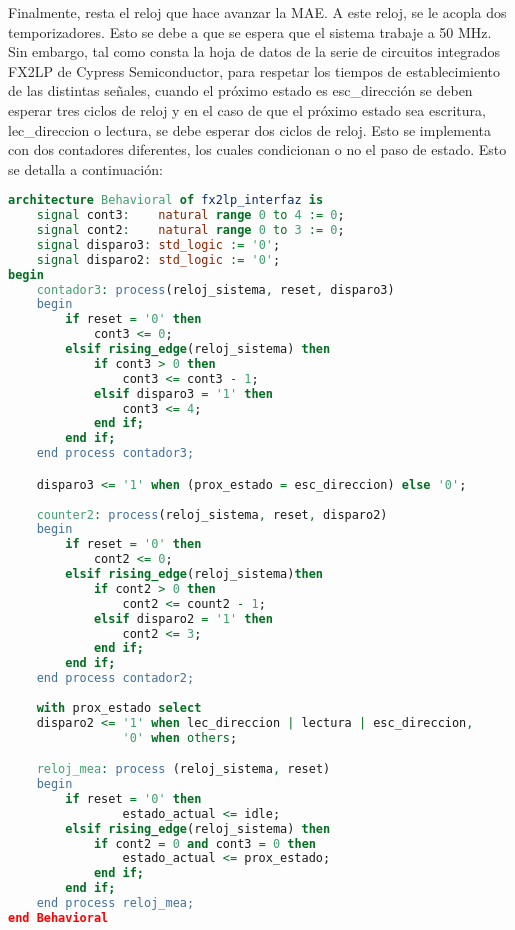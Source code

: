 Finalmente, resta el reloj que hace avanzar la MAE. A este reloj, se le acopla dos temporizadores. Esto se debe a que se espera que el sistema trabaje a 50 MHz. Sin embargo, tal como consta la hoja de datos de la serie de circuitos integrados FX2LP de Cypress Semiconductor\cite{Cypress2017}, para respetar los tiempos de establecimiento de las distintas señales, cuando el próximo estado es esc\_dirección se deben esperar tres ciclos de reloj y en el caso de que el próximo estado sea escritura, lec\_direccion o lectura, se debe esperar dos ciclos de reloj.
Esto se implementa con dos contadores diferentes, los cuales condicionan o no el paso de estado. Esto se detalla a continuación:

\begin{lstlisting}[language=VHDL,backgroundcolor=\color{gray!30}]
architecture Behavioral of fx2lp_interfaz is
	signal cont3:	 natural range 0 to 4 := 0;
	signal cont2:	 natural range 0 to 3 := 0;
	signal disparo3: std_logic := '0';
	signal disparo2: std_logic := '0';
begin
	contador3: process(reloj_sistema, reset, disparo3)
	begin
		if reset = '0' then
			cont3 <= 0;
		elsif rising_edge(reloj_sistema) then
			if cont3 > 0 then
				cont3 <= cont3 - 1;
			elsif disparo3 = '1' then
				cont3 <= 4;
			end if;
		end if;
	end process contador3;

	disparo3 <= '1' when (prox_estado = esc_direccion) else '0';
	
	counter2: process(reloj_sistema, reset, disparo2)
	begin
		if reset = '0' then
			cont2 <= 0;
		elsif rising_edge(reloj_sistema)then
			if cont2 > 0 then
				cont2 <= count2 - 1;
			elsif disparo2 = '1' then
				cont2 <= 3;
			end if;
		end if;
	end process contador2;
	
	with prox_estado select
	disparo2 <=	'1' when lec_direccion | lectura | esc_direccion,
				'0' when others;

	reloj_mea: process (reloj_sistema, reset)
	begin
		if reset = '0' then
				estado_actual <= idle;
		elsif rising_edge(reloj_sistema) then
			if cont2 = 0 and cont3 = 0 then
				estado_actual <= prox_estado;
			end if;
		end if;
	end process reloj_mea;
end Behavioral
\end{lstlisting}

